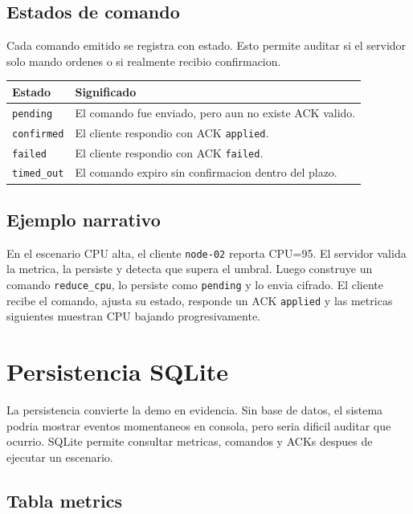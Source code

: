 \documentclass[11pt,letterpaper]{article}
\begin{document}
\subsection{Estados de comando}

Cada comando emitido se registra con estado. Esto permite auditar si el servidor
solo mando ordenes o si realmente recibio confirmacion.

\begin{longtable}{|p{}|p{}|}
\hline
\textbf{Estado} & \textbf{Significado} \\
\hline
\texttt{pending} & El comando fue enviado, pero aun no existe ACK valido. \\
\hline
\texttt{confirmed} & El cliente respondio con ACK \texttt{applied}. \\
\hline
\texttt{failed} & El cliente respondio con ACK \texttt{failed}. \\
\hline
\texttt{timed\_out} & El comando expiro sin confirmacion dentro del plazo. \\
\hline
\end{longtable}

\subsection{Ejemplo narrativo}

En el escenario CPU alta, el cliente \texttt{node-02} reporta CPU=95. El servidor
valida la metrica, la persiste y detecta que supera el umbral. Luego construye un
comando \texttt{reduce\_cpu}, lo persiste como \texttt{pending} y lo envia cifrado.
El cliente recibe el comando, ajusta su estado, responde un ACK \texttt{applied} y
las metricas siguientes muestran CPU bajando progresivamente.

\newpage
\section{Persistencia SQLite}

La persistencia convierte la demo en evidencia. Sin base de datos, el sistema
podria mostrar eventos momentaneos en consola, pero seria dificil auditar que
ocurrio. SQLite permite consultar metricas, comandos y ACKs despues de ejecutar
un escenario.

\subsection{Tabla metrics}
\end{document}

